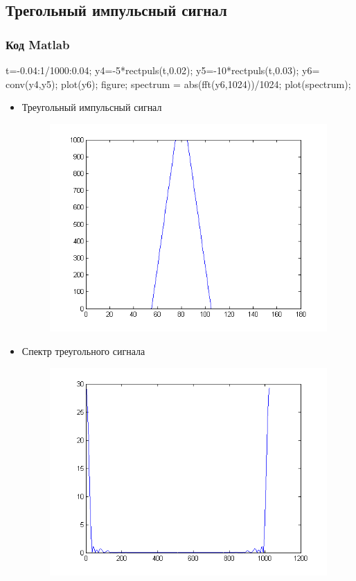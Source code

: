 \documentclass[10pt,a4paper]{article}
\begin{document}
\subsection{Трегольный импульсный сигнал}
\subsubsection{Код Matlab}
t=-0.04:1/1000:0.04;\newline
y4=-5*rectpuls(t,0.02);\newline
y5=-10*rectpuls(t,0.03);\newline
y6= conv(y4,y5);\newline
plot(y6);\newline
figure;\newline
spectrum = abs(fft(y6,1024))/1024;\newline
plot(spectrum);\newline
\begin{itemize}
\item Треугольный импульсный сигнал
\begin{figure}[h]
\centering
\includegraphics[width=12cm]{5.png} 
\end{figure}
\item Спектр треугольного сигнала
\begin{figure}[h]
\centering
\includegraphics[width=12cm]{6.png} 
\end{figure}
\end{itemize}
\FloatBarrier
\end{document}
